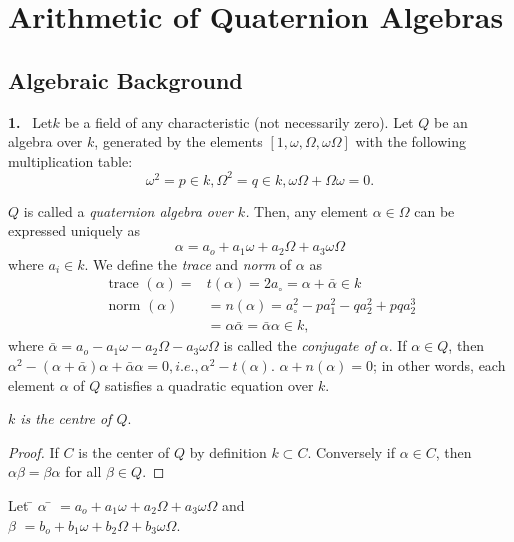 
\chapter{Arithmetic of Quaternion Algebras}\label{chap1}

\setcounter{page}{1}

\section{Algebraic Background}\label{chap1:sec1}

\textbf{1.}~ Let\pageoriginale $k$ be a field of any characteristic (not necessarily
zero). Let $Q$ be an algebra over $k$, generated by the elements $[1,
  \omega, \Omega, \omega \Omega]$ with the following multiplication
table: 
$$
\omega^2 = p \in k, \Omega^2 = q \in k, \omega \Omega + \Omega  \omega =0. 
$$

$Q$ is called a \textit{ quaternion algebra over $k$.} Then, any
element $\alpha \in \Omega$ can be expressed uniquely as  
$$
\alpha = a_o + a_1 \omega + a_2 \Omega + a_3 \omega \Omega
$$
where $a_i \in k$. We define the \textit{trace } and \textit{norm} of
$\alpha$ as  
\begin{align*}
  \text{ trace } (\alpha)= & t(\alpha)= 2 a_\circ = \alpha +
  \bar{\alpha} \in k\\ 
  \text{ norm }(\alpha)& = n(\alpha) = a^2_\circ - p a^2_1 - q a^2_2
  + pq a^3_2\\ 
  & = \alpha \bar{\alpha} = \bar{\alpha}\alpha \in k,
\end{align*}
where $\bar{\alpha} =a_o -a_1 \omega -a_2 \Omega - a_3 \omega \Omega$
is called the \textit{conjugate of } $\alpha$. If $\alpha \in Q$, then
$\alpha^2 - (\alpha + \bar{\alpha}) \alpha +
\bar{\alpha}\alpha=0,i.e., \alpha^2 - t(\alpha)$.  $\alpha+n(\alpha)
=0$; in other words, each element $\alpha$ of $Q$ satisfies a
quadratic equation over $k$.
 
\begin{theorem}\label{chap1:sec1:thm1} %
  {\em $k$ is the centre of $Q$}.
\end{theorem}

\begin{proof}
  If $C$ is the center of $Q$ by definition $k \subset C$. Conversely
  if $\alpha \in C$, then $\alpha \beta = \beta \alpha$ for all $\beta
  \in Q$. 
\end{proof}
\begin{tabbing}
  \qquad Let \qquad \= $\alpha$ \= $= a_o + a_1 \omega + a_2 \Omega + a_3 \omega
  \Omega$ \hspace{1cm}and\\  
  \>$\beta$ \> $ = b_o + b_1 \omega + b_2 \Omega + b_3 \omega \Omega$.
\end{tabbing}

